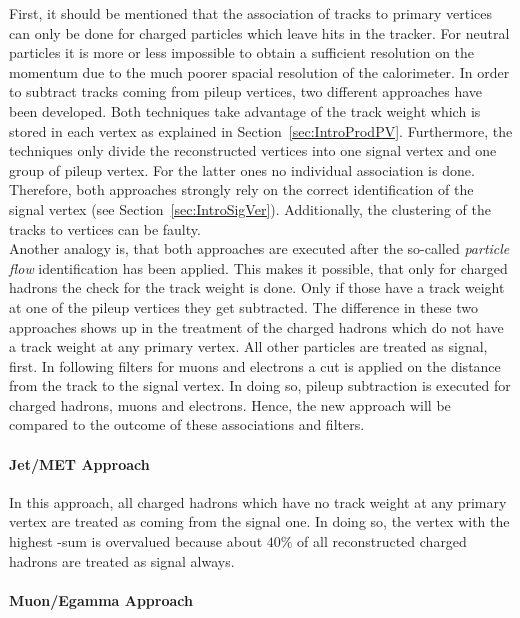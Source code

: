 First, it should be mentioned that the association of tracks to primary vertices can only be done for charged particles which leave hits in the tracker. For neutral particles it is more or less impossible to obtain a sufficient resolution on the momentum due to the much poorer spacial resolution of the calorimeter. In order to subtract tracks coming from pileup vertices, two different approaches have been developed. Both techniques take advantage of the track weight which is stored in each vertex as explained in Section~\ref{sec:IntroProdPV}. Furthermore, the techniques only divide the reconstructed vertices into one signal vertex and one group of pileup vertex. For the latter ones no individual association is done. Therefore, both approaches strongly rely on the correct identification of the signal vertex (see Section~\ref{sec:IntroSigVer}). Additionally, the clustering of the tracks to vertices can be faulty. \\
Another analogy is, that both approaches are executed after the so-called \textit{particle flow} identification has been applied. This makes it possible, that only for charged hadrons  the check for the track weight is done.  Only if those have a track weight at one of the pileup vertices they get subtracted. The difference in these two approaches shows up in the treatment of the charged hadrons which do not have a track weight at any primary vertex. All other particles are treated as signal, first. In following filters for muons and electrons a cut is applied on the distance from the track to the signal vertex. In doing so, pileup subtraction is executed for charged hadrons, muons and electrons. Hence, the new approach will be compared to the outcome of these associations and filters.

\paragraph{Jet/MET Approach \label{sec:IntroJM}}

In this approach, all charged hadrons which have no track weight at any primary vertex are treated as coming from the signal one. In doing so, the vertex with the highest \pt-sum is overvalued because about $40\%$ of all reconstructed charged hadrons are treated as signal always.

\paragraph{Muon/Egamma Approach \label{sec:IntroME}}

